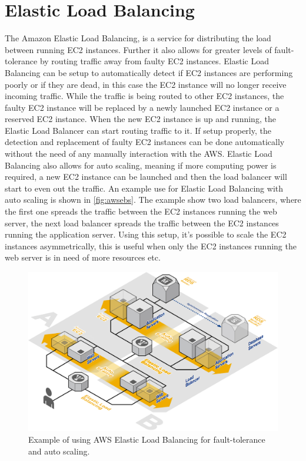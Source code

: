 \documentclass[11pt]{report}
\begin{document}
\section{Elastic Load Balancing}
The Amazon Elastic Load Balancing, is a service for distributing the load between running EC2 instances. Further it also allows for greater levels of fault-tolerance by routing traffic away from faulty EC2 instances. Elastic Load Balancing can be setup to automatically detect if EC2 instances are performing poorly or if they are dead, in this case the EC2 instance will no longer receive incoming traffic. While the traffic is being routed to other EC2 instances, the faulty EC2 instance will be replaced by a newly launched EC2 instance or a reserved EC2 instance. When the new EC2 instance is up and running, the Elastic Load Balancer can start routing traffic to it. If setup properly, the detection and replacement of faulty EC2 instances can be done automatically without the need of any manually interaction with the AWS. Elastic Load Balancing also allows for auto scaling, meaning if more computing power is required, a new EC2 instance can be launched and then the load balancer will start to even out the traffic. An example use for Elastic Load Balancing with auto scaling is shown in \autoref{fig:awsebs}. The example show two load balancers, where the first one spreads the traffic between the EC2 instances running the web server, the next load balancer spreads the traffic between the EC2 instances running the application server. Using this setup, it's possible to scale the EC2 instances asymmetrically, this is useful when only the EC2 instances running the web server is in need of more resources etc.

\begin{figure}[H]
\centering
\includegraphics[scale=.38]{../GFX/aws_elb_web.jpg}
\caption{Example of using AWS Elastic Load Balancing for fault-tolerance and auto scaling.}
\label{fig:awsebs}
\end{figure}
\end{document}
